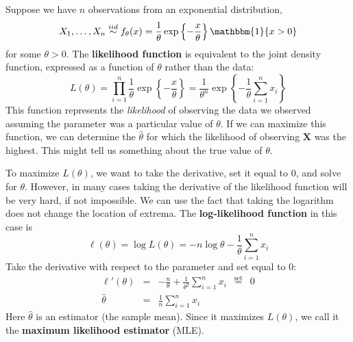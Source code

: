 \documentclass[11pt,fleqn]{book} %
\newlength\tindent
\renewcommand{\indent}{\hspace*{\tindent}}
\begin{document}
	\begin{example}
		Suppose we have $n$ observations from an exponential distribution,
		$$
			X_1, \dots, X_n \stackrel{iid}{\sim} f_\theta(x)=\frac{1}{\theta}\exp\left\{-\frac{x}{\theta}\right\}\mathbbm{1}\{x>0\}
		$$
		for some $\theta > 0$. The \textbf{likelihood function} is equivalent to the joint density function, expressed as a function of $\theta$ rather than the data:
		$$
			L(\theta) = \prod_{i=1}^n \frac{1}{\theta}\exp\left\{-\frac{x}{\theta}\right\} = \frac{1}{\theta^n}\exp\left\{-\frac{1}{\theta}\sum_{i=1}^n x_i\right\}
		$$
		This function represents the \emph{likelihood} of observing the data we observed assuming the parameter was a particular value of $\theta$. If we can maximize this function, we can determine the $\hat{\theta}$ for which the likelihood of observing $\bm{X}$ was the highest. This might tell us something about the true value of $\theta$.

		\indent To maximize $L(\theta)$, we want to take the derivative, set it equal to 0, and solve for $\theta$. However, in many cases taking the derivative of the likelihood function will be very hard, if not impossible. We can use the fact that taking the logarithm does not change the location of extrema. The \textbf{log-likelihood function} in this case is
		\begin{equation*}
			\ell(\theta) = \log L(\theta) = -n \log \theta - \frac{1}{\theta} \sum_{i=1}^n x_i
		\end{equation*}
		Take the derivative with respect to the parameter and set equal to 0:
		\begin{eqnarray*}
			\ell'(\theta) &=& -\frac{n}{\theta} + \frac{1}{\theta^2} \sum_{i=1}^n x_i \enspace \stackrel{\textrm{set}}{=} \enspace 0\\
			\hat{\theta} &=& \frac{1}{n} \sum_{i=1}^n x_i
		\end{eqnarray*}
		Here $\hat{\theta}$ is an estimator (the sample mean). Since it maximizes $L(\theta)$, we call it the \textbf{maximum likelihood estimator} (MLE).
	\end{example}
\end{document}
